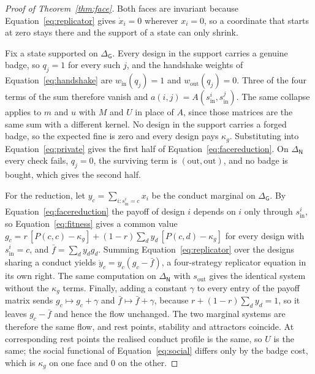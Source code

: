 \documentclass[11pt,a4paper]{article}
\begin{document}
\begin{proof}[Proof of Theorem~\ref{thm:face}]
Both faces are invariant because Equation~\eqref{eq:replicator} gives
$\dot{x}_i = 0$ wherever $x_i = 0$, so a coordinate that starts at zero stays
there and the support of a state can only shrink.

Fix a state supported on $\Delta_{\mathsf{G}}$. Every design in the support
carries a genuine badge, so $q_j = 1$ for every such $j$, and the handshake
weights of Equation~\eqref{eq:handshake} are $w_{\mathrm{in}}(q_j) = 1$ and
$w_{\mathrm{out}}(q_j) = 0$. Three of the four terms of the sum therefore
vanish and $a(i,j) = A(s^{i}_{\mathrm{in}}, s^{j}_{\mathrm{in}})$. The same
collapse applies to $m$ and $u$ with $M$ and $U$ in place of $A$, since those
matrices are the same sum with a different kernel. No design in the support
carries a forged badge, so the expected fine is zero and every design pays
$\kappa_g$. Substituting into Equation~\eqref{eq:private} gives the first half
of Equation~\eqref{eq:facereduction}. On $\Delta_{\mathsf{N}}$ every check
fails, $q_j = 0$, the surviving term is $(\mathrm{out}, \mathrm{out})$, and no
badge is bought, which gives the second half.

For the reduction, let $y_c = \sum_{i : s^{i}_{\mathrm{in}} = c} x_i$ be the
conduct marginal on $\Delta_{\mathsf{G}}$. By
Equation~\eqref{eq:facereduction} the payoff of design $i$ depends on $i$ only
through $s^{i}_{\mathrm{in}}$, so Equation~\eqref{eq:fitness} gives a common
value $g_c = r\,[P(c,c) - \kappa_g] + (1-r)\sum_d y_d\,[P(c,d) - \kappa_g]$ for
every design with $s^{i}_{\mathrm{in}} = c$, and $\bar{f} = \sum_d y_d g_d$.
Summing Equation~\eqref{eq:replicator} over the designs sharing a conduct
yields $\dot{y}_c = y_c (g_c - \bar{f})$, a four-strategy replicator equation
in its own right. The same computation on $\Delta_{\mathsf{N}}$ with
$s_{\mathrm{out}}$ gives the identical system without the $\kappa_g$ terms.
Finally, adding a constant $\gamma$ to every entry of the payoff matrix sends
$g_c \mapsto g_c + \gamma$ and $\bar{f} \mapsto \bar{f} + \gamma$, because
$r + (1-r)\sum_d y_d = 1$, so it leaves $g_c - \bar{f}$ and hence the flow
unchanged. The two marginal systems are therefore the same flow, and rest
points, stability and attractors coincide. At corresponding rest points the
realised conduct profile is the same, so $U$ is the same; the social functional
of Equation~\eqref{eq:social} differs only by the badge cost, which is
$\kappa_g$ on one face and $0$ on the other.
\end{proof}
\end{document}
